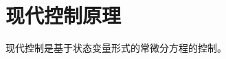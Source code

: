 \documentclass[main.tex]{subfiles}
\begin{document}
\section{现代控制原理}
现代控制是基于状态变量形式的常微分方程的控制。
\end{document}
